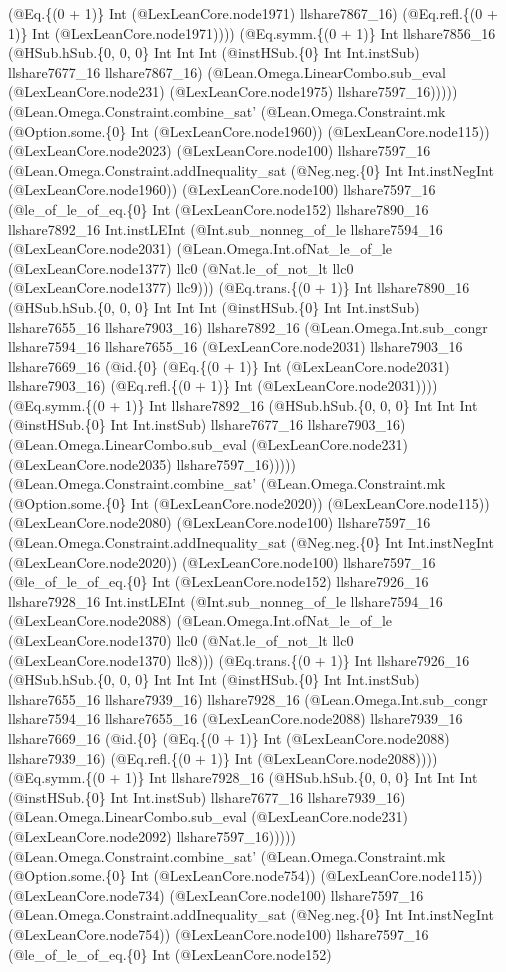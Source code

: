 \documentclass[11pt]{article}
\begin{document}
(@Eq.\{(0 + 1)\} Int (@LexLeanCore.node1971) llshare7867\_16) (@Eq.refl.\{(0 + 1)\} Int (@LexLeanCore.node1971)))) (@Eq.symm.\{(0 + 1)\} Int llshare7856\_16 (@HSub.hSub.\{0, 0, 0\} Int Int Int (@instHSub.\{0\} Int Int.instSub) llshare7677\_16 llshare7867\_16) (@Lean.Omega.LinearCombo.sub\_eval (@LexLeanCore.node231) (@LexLeanCore.node1975) llshare7597\_16))))) (@Lean.Omega.Constraint.combine\_sat' (@Lean.Omega.Constraint.mk (@Option.some.\{0\} Int (@LexLeanCore.node1960)) (@LexLeanCore.node115)) (@LexLeanCore.node2023) (@LexLeanCore.node100) llshare7597\_16 (@Lean.Omega.Constraint.addInequality\_sat (@Neg.neg.\{0\} Int Int.instNegInt (@LexLeanCore.node1960)) (@LexLeanCore.node100) llshare7597\_16 (@le\_of\_le\_of\_eq.\{0\} Int (@LexLeanCore.node152) llshare7890\_16 llshare7892\_16 Int.instLEInt (@Int.sub\_nonneg\_of\_le llshare7594\_16 (@LexLeanCore.node2031) (@Lean.Omega.Int.ofNat\_le\_of\_le (@LexLeanCore.node1377) llc0 (@Nat.le\_of\_not\_lt llc0 (@LexLeanCore.node1377) llc9))) (@Eq.trans.\{(0 + 1)\} Int llshare7890\_16 (@HSub.hSub.\{0, 0, 0\} Int Int Int (@instHSub.\{0\} Int Int.instSub) llshare7655\_16 llshare7903\_16) llshare7892\_16 (@Lean.Omega.Int.sub\_congr llshare7594\_16 llshare7655\_16 (@LexLeanCore.node2031) llshare7903\_16 llshare7669\_16 (@id.\{0\} (@Eq.\{(0 + 1)\} Int (@LexLeanCore.node2031) llshare7903\_16) (@Eq.refl.\{(0 + 1)\} Int (@LexLeanCore.node2031)))) (@Eq.symm.\{(0 + 1)\} Int llshare7892\_16 (@HSub.hSub.\{0, 0, 0\} Int Int Int (@instHSub.\{0\} Int Int.instSub) llshare7677\_16 llshare7903\_16) (@Lean.Omega.LinearCombo.sub\_eval (@LexLeanCore.node231) (@LexLeanCore.node2035) llshare7597\_16))))) (@Lean.Omega.Constraint.combine\_sat' (@Lean.Omega.Constraint.mk (@Option.some.\{0\} Int (@LexLeanCore.node2020)) (@LexLeanCore.node115)) (@LexLeanCore.node2080) (@LexLeanCore.node100) llshare7597\_16 (@Lean.Omega.Constraint.addInequality\_sat (@Neg.neg.\{0\} Int Int.instNegInt (@LexLeanCore.node2020)) (@LexLeanCore.node100) llshare7597\_16 (@le\_of\_le\_of\_eq.\{0\} Int (@LexLeanCore.node152) llshare7926\_16 llshare7928\_16 Int.instLEInt (@Int.sub\_nonneg\_of\_le llshare7594\_16 (@LexLeanCore.node2088) (@Lean.Omega.Int.ofNat\_le\_of\_le (@LexLeanCore.node1370) llc0 (@Nat.le\_of\_not\_lt llc0 (@LexLeanCore.node1370) llc8))) (@Eq.trans.\{(0 + 1)\} Int llshare7926\_16 (@HSub.hSub.\{0, 0, 0\} Int Int Int (@instHSub.\{0\} Int Int.instSub) llshare7655\_16 llshare7939\_16) llshare7928\_16 (@Lean.Omega.Int.sub\_congr llshare7594\_16 llshare7655\_16 (@LexLeanCore.node2088) llshare7939\_16 llshare7669\_16 (@id.\{0\} (@Eq.\{(0 + 1)\} Int (@LexLeanCore.node2088) llshare7939\_16) (@Eq.refl.\{(0 + 1)\} Int (@LexLeanCore.node2088)))) (@Eq.symm.\{(0 + 1)\} Int llshare7928\_16 (@HSub.hSub.\{0, 0, 0\} Int Int Int (@instHSub.\{0\} Int Int.instSub) llshare7677\_16 llshare7939\_16) (@Lean.Omega.LinearCombo.sub\_eval (@LexLeanCore.node231) (@LexLeanCore.node2092) llshare7597\_16))))) (@Lean.Omega.Constraint.combine\_sat' (@Lean.Omega.Constraint.mk (@Option.some.\{0\} Int (@LexLeanCore.node754)) (@LexLeanCore.node115)) (@LexLeanCore.node734) (@LexLeanCore.node100) llshare7597\_16 (@Lean.Omega.Constraint.addInequality\_sat (@Neg.neg.\{0\} Int Int.instNegInt (@LexLeanCore.node754)) (@LexLeanCore.node100) llshare7597\_16 (@le\_of\_le\_of\_eq.\{0\} Int (@LexLeanCore.node152) 
\end{document}
